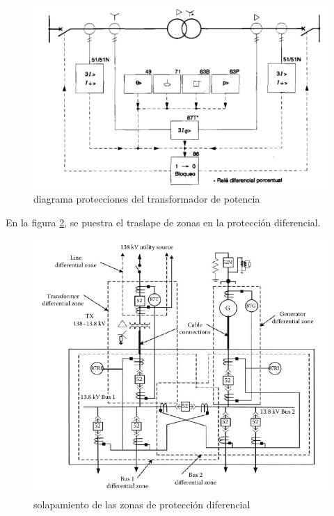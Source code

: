 \documentclass[a5paper]{book}%
\begin{document}
           \begin{figure}[H]
      \centering  
      \caption{diagrama protecciones del  transformador de potencia}
      \label{fig:diagramatrafo1}
      \includegraphics[width=\linewidth]{proteccion_trafo_1}
    \end{figure}

En la figura \ref{fig:zonas_diferencial},  se puestra el traslape de
zonas en la protección diferencial.
    
    \begin{figure}[H]
      \centering
      \includegraphics[width=\linewidth]{diferencial_tranformador}
      \caption{solapamiento de las zonas de protección diferencial}
      \label{fig:zonas_diferencial}
    \end{figure}
    
\end{document}
